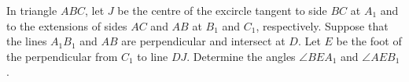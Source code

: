 In triangle $ABC$, let $J$ be the centre of the excircle tangent to side $BC$ at $A_1$ and to the extensions of sides $AC$ and $AB$ at $B_1$ and $C_1$, respectively. Suppose that the lines $A_1B_1$ and $AB$ are perpendicular and intersect at $D$. Let $E$ be the foot of the perpendicular from $C_1$ to line $DJ$. Determine the angles $\angle BEA_1$ and $\angle AEB_1$.

